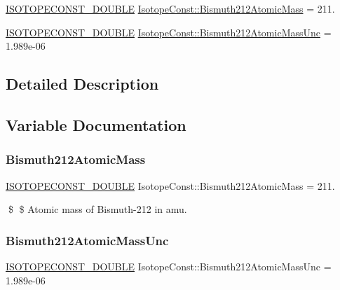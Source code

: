 \begin{DoxyCompactItemize}
\item 
\mbox{\hyperlink{group___isotope_const-_macros_ga8f45a7272ce02c0b4c65c44636ed719a}{I\+S\+O\+T\+O\+P\+E\+C\+O\+N\+S\+T\+\_\+\+D\+O\+U\+B\+LE}} \mbox{\hyperlink{group___isotope_const-_bismuth-_bi212_ga972cde019f726701fc1a4ec8b24a6a71}{Isotope\+Const\+::\+Bismuth212\+Atomic\+Mass}} = 211.
\item 
\mbox{\hyperlink{group___isotope_const-_macros_ga8f45a7272ce02c0b4c65c44636ed719a}{I\+S\+O\+T\+O\+P\+E\+C\+O\+N\+S\+T\+\_\+\+D\+O\+U\+B\+LE}} \mbox{\hyperlink{group___isotope_const-_bismuth-_bi212_ga4c41adef85a44bd6eb4e22491f83cd9d}{Isotope\+Const\+::\+Bismuth212\+Atomic\+Mass\+Unc}} = 1.\+989e-\/06
\end{DoxyCompactItemize}


\subsection{Detailed Description}


\subsection{Variable Documentation}
\mbox{\label{group___isotope_const-_bismuth-_bi212_ga972cde019f726701fc1a4ec8b24a6a71}} 
\subsubsection{\texorpdfstring{Bismuth212\+Atomic\+Mass}{Bismuth212AtomicMass}}
{\footnotesize\ttfamily \mbox{\hyperlink{group___isotope_const-_macros_ga8f45a7272ce02c0b4c65c44636ed719a}{I\+S\+O\+T\+O\+P\+E\+C\+O\+N\+S\+T\+\_\+\+D\+O\+U\+B\+LE}} Isotope\+Const\+::\+Bismuth212\+Atomic\+Mass = 211.}

\$ \$ Atomic mass of Bismuth-\/212 in amu. \mbox{\label{group___isotope_const-_bismuth-_bi212_ga4c41adef85a44bd6eb4e22491f83cd9d}} 
\subsubsection{\texorpdfstring{Bismuth212\+Atomic\+Mass\+Unc}{Bismuth212AtomicMassUnc}}
{\footnotesize\ttfamily \mbox{\hyperlink{group___isotope_const-_macros_ga8f45a7272ce02c0b4c65c44636ed719a}{I\+S\+O\+T\+O\+P\+E\+C\+O\+N\+S\+T\+\_\+\+D\+O\+U\+B\+LE}} Isotope\+Const\+::\+Bismuth212\+Atomic\+Mass\+Unc = 1.\+989e-\/06}

